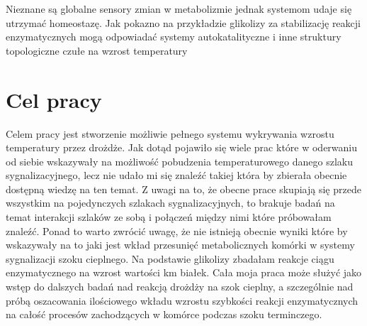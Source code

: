 \documentclass{pracamgr}
\begin{document}
Nieznane są globalne sensory zmian w metabolizmie jednak systemom udaje się utrzymać homeostazę. Jak pokazno 
na przykładzie glikolizy za stabilizację reakcji enzymatycznych mogą odpowiadać systemy autokatalityczne i 
inne struktury topologiczne czułe na wzrost temperatury \cite{Mair05,AutocatalysisGlycolysis} 

% 
% 
% 


% 




\chapter{Cel pracy}

Celem pracy jest stworzenie możliwie pełnego systemu wykrywania wzrostu temperatury przez drożdże. 
Jak dotąd pojawiło się wiele prac które w oderwaniu od siebie wskazywały na możliwość pobudzenia
temperaturowego danego szlaku sygnalizacyjnego, lecz nie udało mi się znaleźć takiej która by 
zbierała obecnie dostępną wiedzę na ten temat. Z uwagi na to, że obecne prace skupiają się
przede wszystkim na pojedynczych szlakach sygnalizacyjnych, to brakuje badań na temat 
interakcji szlaków ze sobą i połączeń między nimi które próbowałam znaleźć. Ponad to warto zwrócić uwagę, że
nie istnieją obecnie wyniki które by wskazywały na to jaki jest wkład przesunięć metabolicznych
komórki w systemy sygnalizacji szoku cieplnego. Na podstawie glikolizy zbadałam reakcje ciągu 
enzymatycznego na wzrost wartości km białek. Cała moja praca może służyć jako wstęp do dalszych badań
nad reakcją drożdży na szok cieplny, a szczególnie nad próbą oszacowania ilościowego wkładu 
wzrostu szybkości reakcji enzymatycznych na całość procesów zachodzących w komórce podczas szoku terminczego.
\end{document}
